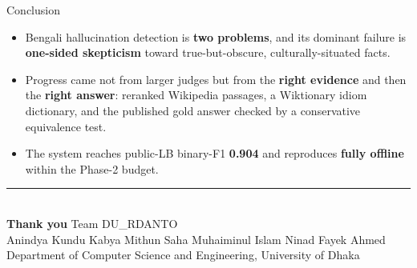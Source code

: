 \documentclass[aspectratio=169,11pt,t]{beamer}
\newcommand{\metric}[1]{{\color{primary}\bfseries #1}}
\begin{document}
\begin{frame}{Conclusion}
  \begin{itemize}
    \item Bengali hallucination detection is \textbf{two problems}, and its dominant failure is \textbf{one-sided skepticism} toward true-but-obscure, culturally-situated facts.
    \item Progress came not from larger judges but from the \textbf{right evidence} and then the \textbf{right answer}: reranked Wikipedia passages, a Wiktionary idiom dictionary, and the published gold answer checked by a conservative equivalence test.
    \item The system reaches public-LB binary-F1 \metric{0.904} and reproduces \textbf{fully offline} within the Phase-2 budget.
  \end{itemize}
  \vspace{1.0em}
  \begin{center}
    {\color{accent}\rule{6cm}{1.2pt}}\\[0.7em]
    {\large\bfseries\color{primary} Thank you} \;\textbullet\; Team DU\_RDANTO\\[0.3em]
    {\footnotesize\color{soft} Anindya Kundu \;\textbullet\; Kabya Mithun Saha \;\textbullet\; Muhaiminul Islam Ninad \;\textbullet\; Fayek Ahmed}\\[0.2em]
    {\footnotesize\color{soft} Department of Computer Science and Engineering, University of Dhaka}
  \end{center}
\end{frame}
\end{document}
